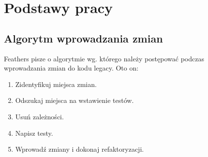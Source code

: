 \section{Podstawy pracy}
	\subsection{Algorytm wprowadzania zmian}
	 Feathers pisze o algorytmie wg. którego należy postępować podczas wprowadzania zmian do kodu legacy.
	 Oto on:
		\begin{enumerate}
\item Zidentyfikuj miejsca zmian.
\item Odszukaj miejsca na wstawienie testów.
\item Usuń zależności.
\item Napisz testy.
\item Wprowadź zmiany i dokonaj refaktoryzacji.
		\end{enumerate}
	